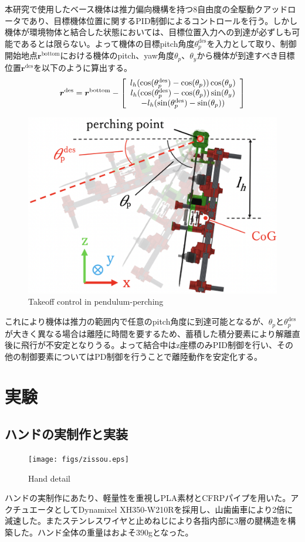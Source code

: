\documentclass{jarticle}
\begin{document}
本研究で使用したベース機体は推力偏向機構を持つ8自由度の全駆動クアッドロータであり、目標機体位置に関するPID制御によるコントロールを行う。しかし機体が環境物体と結合した状態においては、目標位置入力への到達が必ずしも可能であるとは限らない。よって機体の目標pitch角度$\theta_p^\text{des}$を入力として取り、制御開始地点$\bm{r}^\text{bottom}$における機体のpitch、yaw角度$\theta_p、\theta_y$から機体が到達すべき目標位置$\bm{r}^\text{des}$を以下のように算出する。
\vspace{-2mm}
\begin{equation}
  \bm{r}^\text{des} = \bm{r}^\text{bottom} -
  \left[ \begin{array}{c} l_h(\cos(\theta_p^\text{des}) - \cos(\theta_p))\cos(\theta_y) \\
      l_h(\cos(\theta_p^\text{des}) - \cos(\theta_p))\sin(\theta_y) \\
      -l_h(\sin(\theta_p^\text{des}) - \sin(\theta_p))
    \end{array} \right]
  \vspace{-2mm}
  \label{eq:rset}
\end{equation}
\begin{figure}[tb]
  \centering
  \includegraphics[width=0.6\columnwidth]{figs/rset.eps}
  \caption{Takeoff control in pendulum-perching}
  \vspace{-4mm}
  \label{fig:rset}
\end{figure}
これにより機体は推力の範囲内で任意のpitch角度に到達可能となるが、$\theta_p$と$\theta_p^\text{des}$が大きく異なる場合は離陸に時間を要するため、蓄積した積分要素により解離直後に飛行が不安定となりうる。よって結合中はz座標のみPID制御を行い、その他の制御要素についてはPD制御を行うことで離陸動作を安定化する。

\section{実験}
\subsection{ハンドの実制作と実装}
\vspace{-2mm}
\begin{figure}[h]
  \centering
  \texttt{[image: figs/zissou.eps]}
  \caption{Hand detail}
  \vspace{-2mm}
  \label{fig:zissou}
\end{figure}
ハンドの実制作にあたり、軽量性を重視しPLA素材とCFRPパイプを用いた。アクチュエータとしてDynamixel XH350-W210Rを採用し、山歯歯車により2倍に減速した。またステンレスワイヤと止めねじにより各指内部に3層の腱構造を構築した。ハンド全体の重量はおよそ390gとなった。
\end{document}
